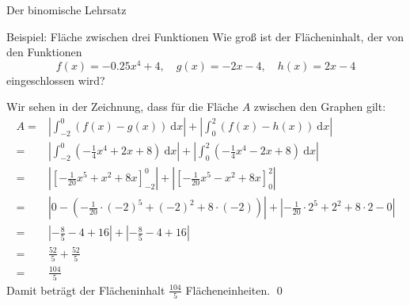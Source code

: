 \documentclass[german]{spicker}
\renewcommand{\abs}[1]{\left| #1 \right|}
\newcommand{\dx}{~\mathrm{d}x}
\begin{document}
\begin{defi}{Der binomische Lehrsatz}
\begin{bonus}{Beispiel: Fläche zwischen drei Funktionen}
    Wie groß ist der Flächeninhalt, der von den Funktionen
    $$
        f(x) = -0.25x^4 + 4, \quad g(x) = -2x-4, \quad h(x) = 2x-4
    $$
    eingeschlossen wird?
    \begin{center}
    \end{center}

    Wir sehen in der Zeichnung, dass für die Fläche $A$ zwischen den Graphen gilt:
    $$
        \begin{aligned}
            A ={} & \abs{  \int_{-2}^{0} \left(f(x) - g(x)\right) \dx} + \abs{ \int_{0}^{2} \left(f(x) - h(x)\right) \dx}                           \\
            ={}   & \abs{ \int_{-2}^{0} \left(-\frac{1}{4}x^4 + 2x + 8\right) \dx} + \abs{ \int_{0}^{2} \left(-\frac{1}{4}x^4 - 2x + 8\right) \dx}  \\
            ={}   & \abs{ \left[ -\frac{1}{20}x^5 + x^2 + 8x \right]_{-2}^{0} } + \abs{ \left[ -\frac{1}{20}x^5 - x^2 + 8x \right]_0^2 }            \\
            ={}   & \abs{ 0 - \left( -\frac{1}{20}\cdot(-2)^5 + (-2)^2 + 8\cdot(-2) \right) } + \abs{ -\frac{1}{20}\cdot 2^5 + 2^2 + 8\cdot 2 - 0 } \\
            ={}   & \abs{-\frac{8}{5} - 4 + 16 } + \abs{-\frac{8}{5} - 4 + 16}                                                                      \\
            ={}   & \frac{52}{5} + \frac{52}{5}                                                                                                     \\
            ={}   & \frac{104}{5}
        \end{aligned}
    $$
    Damit beträgt der Flächeninhalt $\frac{104}{5}$ Flächeneinheiten. \qed
\end{bonus}


\end{defi}
\end{document}

